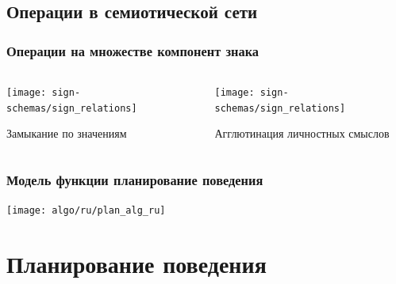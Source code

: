 \documentclass[default]{beamer}
\begin{document}
	\subsection{Операции в семиотической сети}	

	\begin{frame}
		\frametitle{Операции на множестве компонент знака}
		
		\begin{columns}
			\begin{column}{0.5\textwidth}
				\centering
				\texttt{[image: sign-schemas/sign\_relations]}
				\par\bigskip
				Замыкание по значениям
			\end{column}
			\begin{column}{0.5\textwidth}
				\centering
				\texttt{[image: sign-schemas/sign\_relations]}
				\par\bigskip
				Агглютинация личностных смыслов
			\end{column}
		\end{columns}
		\nocite{*}
		\printbibliography[keyword={signoper}, resetnumbers=true]
	\end{frame}	
	
	\begin{frame}
		\frametitle{Модель функции планирование поведения}
		\centering
		\texttt{[image: algo/ru/plan\_alg\_ru]}
		\nocite{*}
		\printbibliography[keyword={signb}, resetnumbers=true]
		\nocite{*}
		\printbibliography[keyword={symbsign}, resetnumbers=true]
	\end{frame}	
	
	\section{Планирование поведения}
\end{document}
